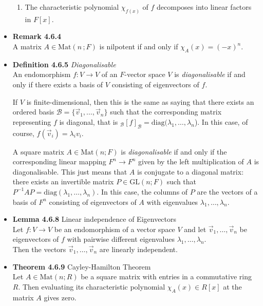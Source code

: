 \documentclass[11pt,a4paper]{article}
\begin{document}
\begin{itemize}
\begin{enumerate}
            \item The characteristic polynomial $\chi_{f(x)}$ of $f$ decomposes into linear
                factors in $F[x]$.

        \end{enumerate}

    \item \textbf{Remark 4.6.4} \\
        A matrix $A \in \mathrm{Mat}(n\, ; F)$ is nilpotent if and only if
        $\chi_A(x) = {(-x)}^n$.

    \item \textbf{Definition 4.6.5} \emph{Diagonalisable} \\
        An endomorphism $f : V \to V$ of an $F$-vector space $V$ is \emph{diagonalisable}
        if and only if there exists a basis of $V$ consisting of eigenvectors of $f$.

        If $V$ is finite-dimensional, then this is the same as saying that there exists an
        ordered basis $\mathcal{B} = \{ \vec{v}_1, \ldots, \vec{v}_n \}$
        such that the corresponding matrix representing $f$ is diagonal,
        that is $_\mathcal{B}{[f]}_\mathcal{B} = \mathrm{diag}(\lambda_1, \ldots, \lambda_n$).
        In this case, of course, $f(\vec{v}_i) = \lambda_i v_i$.

        A square matrix $A \in \mathrm{Mat}(n; F)$ is \emph{diagonalisable} if and only if
        the corresponding linear mapping $F^n \to F^n$ given by the left multiplication of $A$
        is diagonalisable.
        This just means that $A$ is conjugate to a diagonal matrix:
        there exists an invertible matrix $P \in \mathrm{GL}(n; F)$ such that
        $P^{-1} A P = \mathrm{diag}(\lambda_1, \ldots, \lambda_n)$.
        In this case, the columns of $P$ are the vectors of a basis of $F^n$ consisting of
        eigenvectors of $A$ with eigenvalues $\lambda_1, \ldots, \lambda_n$.

    \item \textbf{Lemma 4.6.8} Linear independence of Eigenvectors \\
        Let $f : V \to V$ be an endomorphism of a vector space $V$ and let
        $\vec{v}_1, \ldots, \vec{v}_n$ be eigenvectors of $f$ with pairwise different
        eigenvalues $\lambda_1, \ldots, \lambda_n$. \\
        Then the vectors $\vec{v}_1, \ldots, \vec{v}_n$ are linearly independent.

    \item \textbf{Theorem 4.6.9} Cayley-Hamilton Theorem \\
        Let $A \in \mathrm{Mat}(n; R)$ be a square matrix with entries in a commutative ring
        $R$.
        Then evaluating its characteristic polynomial $\chi_A(x) \in R[x]$ at the matrix $A$
        gives zero.

\end{itemize}
\end{document}
